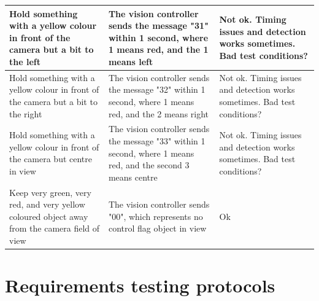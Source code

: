 \documentclass[11pt, titlepage]{article} %
\begin{document}
\begin{table}[h]
\begin{tabular}{|m{5cm}|m{5cm}|m{5cm}|}
Hold something with a yellow colour in front of the camera but a bit to the left  & The vision controller sends the message "31" within 1 second, where 1 means red, and the 1 means left      & Not ok. Timing issues and detection works sometimes. Bad test conditions?  \\ \hline
Hold something with a yellow colour in front of the camera but a bit to the right  & The vision controller sends the message "32" within 1 second, where 1 means red, and the 2 means right      & Not ok. Timing issues and detection works sometimes. Bad test conditions?  \\ \hline
Hold something with a yellow colour in front of the camera but centre in view  & The vision controller sends the message "33" within 1 second, where 1 means red, and the second 3 means centre      & Not ok. Timing issues and detection works sometimes. Bad test conditions?  \\ \hline
Keep very green, very red, and very yellow coloured object away from the camera field of view  &  The vision controller sends "00", which represents no control flag object in view     & Ok  \\ \hline
\end{tabular}
\end{table}

\newpage
\section{Requirements testing protocols}
\label{appendix:requirementsTesting}
\end{document}
